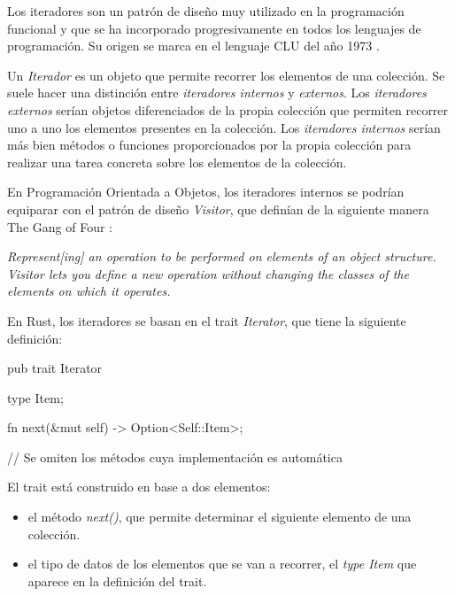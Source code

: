 \documentclass[a4paper,11pt]{extarticle}
\begin{document}
Los iteradores son un patrón de diseño muy utilizado en la programación funcional y que se ha incorporado progresivamente en todos los lenguajes de programación. Su origen se marca en el lenguaje CLU del año 1973 \citep{wikipediaCLUProgrammingLanguage2024}.

Un \textit{Iterador} es un objeto que permite recorrer los elementos de una colección. Se suele hacer una distinción entre \textit{iteradores internos} y \textit{externos}. Los \textit{iteradores externos} serían objetos diferenciados de la propia colección que permiten recorrer uno a uno los elementos presentes en la colección. Los \textit{iteradores internos} serían más bien métodos o funciones proporcionados por la propia colección para realizar una tarea concreta sobre los elementos de la colección.

En Programación Orientada a Objetos, los iteradores internos se podrían equiparar con el patrón de diseño \textit{Visitor}, que definían de la siguiente manera The Gang of Four \citep{wikipediaDesignPatterns2024}:
 \begin{center}
	\begin{minipage}{0.9\linewidth}
		\vspace{5pt}%
		{\small \emph{Represent[ing] an operation to be performed on elements of an object structure. Visitor lets you define a new operation without changing the classes of the elements on which it operates.}
		}
		\vspace{5pt}%
	\end{minipage}
\end{center}

En Rust, los iteradores se basan en el trait \textit{Iterator}, que tiene la siguiente definición:

\vspace{0.7em}
\begin{Codigo2}
pub trait Iterator {
   type Item;
	
   fn next(&mut self) -> Option<Self::Item>;
	
   // Se omiten los métodos cuya implementación es automática
}
\end{Codigo2}

El trait está construido en base a dos elementos:

\begin{itemize}
	\item el método \textit{next()}, que permite determinar el siguiente elemento de una colección.
	\item el tipo de datos de los elementos que se van a recorrer, el \textit{type Item} que aparece en la definición del trait.
\end{itemize}
\end{document}
